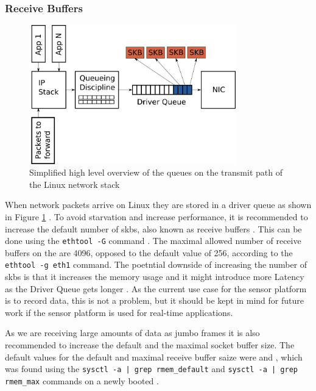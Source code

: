 \subsubsection{Receive Buffers}
\begin{figure}
    \centering
    \includegraphics[width=0.8\textwidth]{figures/linux_networking.png}
    \caption{Simplified high level overview of the queues on the transmit path of the Linux network stack \cite{danQueueingLinuxNetwork2013}}
    \label{fig:linux_network}
\end{figure}
When network packets arrive on Linux they are stored in a driver queue as shown in Figure \ref{fig:linux_network} \cite{danQueueingLinuxNetwork2013}.
To avoid starvation and increase performance, it is recommended to increase the default number of \glspl{skb}, also known as receive buffers \cite{lucidvisionlabsReceiveBuffers2020} \cite{danQueueingLinuxNetwork2013}.
This can be done using the \texttt{ethtool -G} command \cite{danQueueingLinuxNetwork2013}.
The maximal allowed number of receive buffers on the \jx are 4096, opposed to the default value of 256, according to the \texttt{ethtool -g eth1} command.
The poetntial downside of increasing the number of \glspl{skb} is that it increases the memory usage and it might introduce more Latency as the Driver Queue gets longer \cite{danQueueingLinuxNetwork2013}. As the current use case for the sensor platform is to record data, this is not a problem, but it should be kept in mind for future work if the sensor platform is used for real-time applications.

As we are receiving large amounts of data as jumbo frames it is also recommended to increase the default and the maximal socket buffer size.
The default values for the default and maximal receive buffer saize were \todo and \todo, which was found using the \texttt{sysctl -a | grep rmem_default} and \texttt{sysctl -a | grep rmem_max} commands on a newly booted \jx \cite{sainiUnableReadNet2021}.

